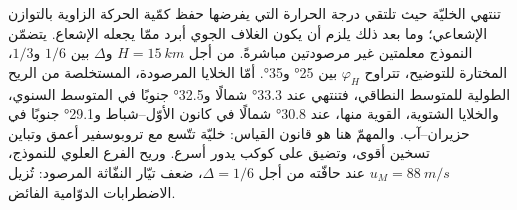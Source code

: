 تنتهي الخليّة حيث تلتقي درجة الحرارة التي يفرضها حفظ كمّية الحركة الزاوية
بالتوازن الإشعاعي؛ وما بعد ذلك يلزم أن يكون الغلاف الجوي
أبرد ممّا يجعله الإشعاع. يتضمّن النموذج معلمتين غير مرصودتين
مباشرةً. من أجل $H = \qty{15}{km}$ و$\Delta$ بين $1/6$
و$1/3$، المختارة للتوضيح، تتراوح $\varphi_H$ بين \ang{25} و\ang{35}.
أمّا الخلايا المرصودة، المستخلصة من الريح الطولية للمتوسط النطاقي، فتنتهي عند
\ang{33.3} شمالًا و\ang{32.5} جنوبًا في المتوسط السنوي، والخلايا الشتوية،
القوية منها، عند \ang{30.8} شمالًا في كانون الأوّل--شباط و\ang{29.1} جنوبًا في
حزيران--آب. والمهمّ هنا هو قانون القياس: خليّة تتّسع مع
تروبوسفير أعمق وتباين تسخين أقوى، وتضيق على
كوكب يدور أسرع. وريح الفرع العلوي للنموذج، $u_M =
\qty{88}{m/s}$ عند حافّته من أجل $\Delta = 1/6$، ضعف تيّار النفّاثة المرصود:
تُزيل الاضطرابات الدوّامية الفائض.

